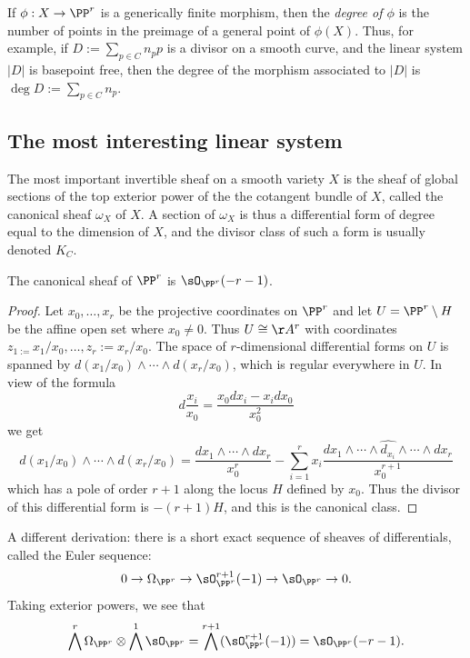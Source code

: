 If $\phi:X \to \PP^r$ is a generically finite morphism, then the \emph{degree of $\phi$} is the number of points in the preimage of a general point of $\phi(X)$. Thus, for example, if $D := \sum_{p\in C} n_pp$ is a divisor on a smooth curve, and the linear system $|D|$ is basepoint free, then the degree of the morphism associated to $|D|$ is $\deg D := \sum_{p\in C} n_p$.

\subsection{The most interesting linear system}

The most important invertible sheaf on a smooth variety $X$ is the sheaf of global sections of the top exterior power of the  the cotangent bundle of $X$, called the canonical sheaf $\omega_X$ of $X$. A section of 
$\omega_X$ is thus a differential form of degree equal to the dimension of $X$, and the divisor class
of such a form is usually denoted $K_C$. 
\begin{theorem}
 The canonical sheaf of $\PP^{r}$ is $\sO_{\PP^{r}}(-r-1)$. 
\end{theorem}
\begin{proof}
Let $x_{0}, \dots, x_{r}$ be the projective coordinates on $\PP^{r}$ and let  $U = \PP^{r}\setminus H$ be the affine open set where $x_{0} \neq 0$. Thus $U \cong \AA^{r}$ with coordinates $z_{1 := }x_{1}/x_{0}, \dots, z_{r}:=x_{r}/x_{0}$. The space of $r$-dimensional differential forms on $U$ is spanned by $d(x_{1}/x_{0})\wedge\cdots\wedge d(x_{r}/x_{0})$, which is regular everywhere in $U$. In view of the formula
$$
d\frac{x_{i}}{x_{0}} = \frac{x_{0}dx_{i}-x_{i}dx_{0}}{x_{0}^{2}}
$$
we get
$$
d(x_{1}/x_{0})\wedge\cdots\wedge d(x_{r}/x_{0}) = \frac{dx_{1}\wedge\cdots\wedge dx_{r}}{x_{0}^{r}}-
\sum_{i=1}^{r} x_{i} \frac{ dx_{1}\wedge\cdots \wedge \widehat{d_{x_{i}}}\wedge \cdots \wedge dx_{r}}{x_{0}^{r+1}}
$$
which has a pole of order $r+1$ along the locus $H$ defined by $x_{0}$. Thus the divisor of this differential form
is $-(r+1)H$, and this is the canonical class.
\end{proof}

\begin{fact}
A different derivation: there is a short exact sequence of sheaves of differentials, called the Euler sequence:
$$
0\to \Omega_{\PP^{r}} \to \sO_{\PP^{r}}^{r+1} (-1) \to \sO_{\PP^{r}} \to 0.
$$
Taking exterior powers, we see that
$$
\bigwedge^{r}\Omega_{\PP^{r}} \otimes \bigwedge^{1}\sO_{\PP^{r}} = \bigwedge^{r+1} (\sO_{\PP^{r}}^{r+1} (-1)) = \sO_{\PP^{r}}(-r-1).
$$
\end{fact}

